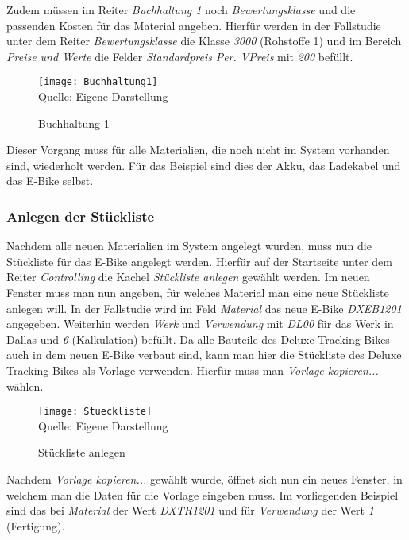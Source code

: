 Zudem müssen im Reiter \textit{Buchhaltung 1} noch \textit{Bewertungsklasse} und die passenden Kosten für das Material angeben. Hierfür werden in der Fallstudie unter dem Reiter \textit{Bewertungsklasse} die Klasse \textit{3000} (Rohstoffe 1) und im Bereich \textit{Preise und Werte} die Felder \textit{Standardpreis} \textit{Per. VPreis} mit \textit{200} befüllt.

\begin{figure}[H]
    \caption{Buchhaltung 1}\label{fig:buchhaltung1}
    \texttt{[image: Buchhaltung1]}
    \\
    Quelle: Eigene Darstellung
\end{figure}

Dieser Vorgang muss für alle Materialien, die noch nicht im System vorhanden sind, wiederholt werden. Für das Beispiel sind dies der Akku, das Ladekabel und das E-Bike selbst.

\subsubsection{Anlegen der Stückliste}
Nachdem alle neuen Materialien im System angelegt wurden, muss nun die Stückliste für das E-Bike angelegt werden. Hierfür auf der Startseite unter dem
 Reiter \textit{Controlling} die Kachel \textit{Stückliste anlegen} gewählt werden. Im neuen Fenster muss man nun angeben, für welches Material man eine neue Stückliste anlegen will. In der Fallstudie wird im Feld \textit{Material} das neue E-Bike \textit{DXEB1201} angegeben. Weiterhin werden \textit{Werk} und \textit{Verwendung} mit \textit{DL00} für das Werk in Dallas und \textit{6} (Kalkulation) befüllt.
 Da alle Bauteile des Deluxe Tracking Bikes auch in dem neuen E-Bike verbaut sind, kann man hier die Stückliste des Deluxe Tracking Bikes als Vorlage verwenden.
 Hierfür muss man \textit{Vorlage kopieren...} wählen.

\begin{figure}[H]
    \caption{Stückliste anlegen}\label{fig:stueckliste}
    \texttt{[image: Stueckliste]}
    \\
    Quelle: Eigene Darstellung
\end{figure}

Nachdem \textit{Vorlage kopieren...} gewählt wurde, öffnet sich nun ein neues Fenster, in welchem man die Daten für die Vorlage eingeben muss. Im vorliegenden Beispiel sind das bei \textit{Material} der Wert 
\textit{DXTR1201} und für \textit{Verwendung} der Wert \textit{1} (Fertigung).

